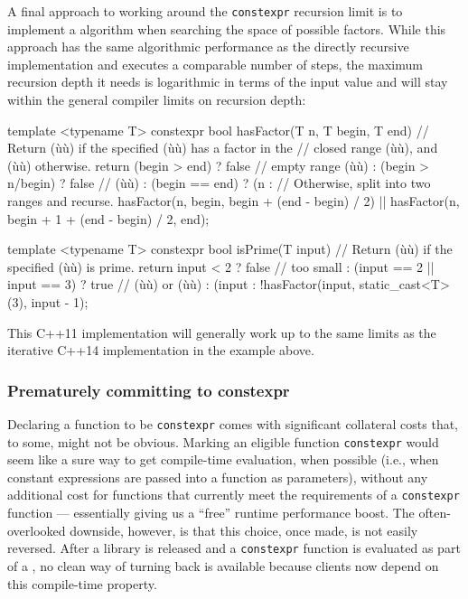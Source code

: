 A final approach to working around the \lstinline!constexpr! recursion
limit is to implement a  algorithm when
searching the space of possible factors. While this approach has the
same algorithmic performance as the directly recursive implementation
and executes a comparable number of steps, the maximum recursion depth
it needs is logarithmic in terms of the input value and will stay within
the general compiler limits on recursion depth:

\begin{emcppslisting}
template <typename T>
constexpr bool hasFactor(T n, T begin, T end)
    // Return (ù{}ù) if the specified (ù{}ù) has a factor in the
    // closed range (ù{}ù), and (ù{}ù) otherwise.
{
    return (begin > end)     ? false             // empty range (ù{}ù)
         : (begin > n/begin) ? false             // (ù{}ù)
         : (begin == end)    ? (n %
         :   // Otherwise, split into two ranges and recurse.
             hasFactor(n, begin, begin + (end - begin) / 2) ||
             hasFactor(n, begin + 1 + (end - begin) / 2, end);
}

template <typename T>
constexpr bool isPrime(T input)
    // Return (ù{}ù) if the specified (ù{}ù) is prime.
{
    return input < 2                  ? false  // too small
         : (input == 2 || input == 3) ? true   // (ù{}ù) or (ù{}ù)
         : (input %
         : !hasFactor(input, static_cast<T>(3), input - 1);
}
\end{emcppslisting}
    

\noindent This C++11 implementation will generally work up to the same limits as
the iterative C++14 implementation in the example above.

\subsubsection[Prematurely committing to \lstinline!constexpr!]{Prematurely committing to {\SubsubsecCode constexpr}}\label{prematurely-committing-to-constexpr}

Declaring a function to be \lstinline!constexpr! comes with significant
collateral costs that, to some, might not be obvious. Marking an
eligible function \lstinline!constexpr! would seem like a sure way to get
compile-time evaluation, when possible (i.e., when constant expressions
are passed into a function as parameters), without any additional cost
for functions that currently meet the requirements of a
\lstinline!constexpr! function --- essentially giving us a ``free'' runtime
performance boost. The often-overlooked downside, however, is that this
choice, once made, is not easily reversed. After a library is released
and a \lstinline!constexpr! function is evaluated as part of a
, no clean way of turning back is available
because clients now depend on this compile-time property.

